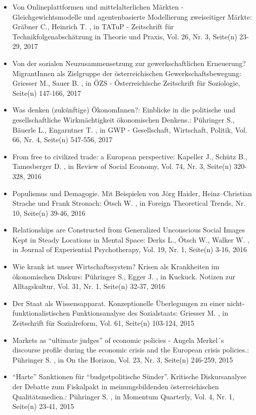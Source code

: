\begin{itemize}
\item Von Onlineplattformen und mittelalterlichen Märkten - Gleichgewichtsmodelle und agentenbasierte Modellierung zweiseitiger Märkte: Gräbner C., Heinrich T. , in TATuP - Zeitschrift für Technikfolgenabschätzung in Theorie und Praxis, Vol. 26, Nr. 3, Seite(n) 23-29, 2017
\item Von der sozialen Neuzusammensetzung zur gewerkschaftlichen Erneuerung? MigrantInnen als Zielgruppe der österreichischen Gewerkschaftsbewegung: Griesser M., Sauer B. , in ÖZS - Österreichische Zeitschrift für Soziologie, Seite(n) 147-166, 2017
\item Was denken (zukünftige) ÖkonomInnen?: Einblicke in die politische und gesellschaftliche Wirkmächtigkeit ökonomischen Denkens.: Pühringer S., Bäuerle L., Engarntner T. , in GWP - Gesellschaft, Wirtschaft, Politik, Vol. 66, Nr. 4, Seite(n) 547-556, 2017
\item From free to civilized trade: a European perspective: Kapeller J., Schütz B., Tamesberger D. , in Review of Social Economy, Vol. 74, Nr. 3, Seite(n) 320-328, 2016
\item Populismus und Demagogie. Mit Beispielen von Jörg Haider, Heinz–Christian Strache und Frank Stronach: Ötsch W. , in Foreign Theoretical Trends, Nr. 10, Seite(n) 39-46, 2016
\item Relationships are Constructed from Generalized Unconscious Social Images Kept in Steady Locations in Mental Space: Derks L., Ötsch W., Walker W. , in Journal of Experiential Psychotherapy, Vol. 19, Nr. 1, Seite(n) 3-16, 2016
\item Wie krank ist unser Wirtschaftssystem? Krisen als Krankheiten im ökonomischen Diskurs: Pühringer S., Egger J. , in Kuckuck. Notizen zur Alltagskultur, Vol. 31, Nr. 1, Seite(n) 32-37, 2016
\item Der Staat als Wissensapparat. Konzeptionelle Überlegungen zu einer nicht-funktionalistischen Funktionsanalyse des Sozialstaats: Griesser M. , in Zeitschrift für Sozialreform, Vol. 61, Seite(n) 103-124, 2015
\item Markets as “ultimate judges” of economic policies - Angela Merkel´s discourse profile during the economic crisis and the European crisis policies.: Pühringer S. , in On the Horizon, Vol. 23, Nr. 3, Seite(n) 246-259, 2015
\item “Harte” Sanktionen für “budgetpolitische Sünder”. Kritische Diskursanalyse der Debatte zum Fiskalpakt in meinungsbildenden österreichischen Qualitätsmedien.: Pühringer S. , in Momentum Quarterly, Vol. 4, Nr. 1, Seite(n) 23-41, 2015

\end{itemize}
